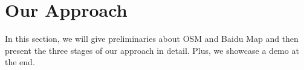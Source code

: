 \section{Our Approach}
\label{sec:approach}


In this section, we will
give preliminaries about OSM and Baidu Map and then present the three
stages of our approach in detail. Plus, we showcase a demo at the end.









